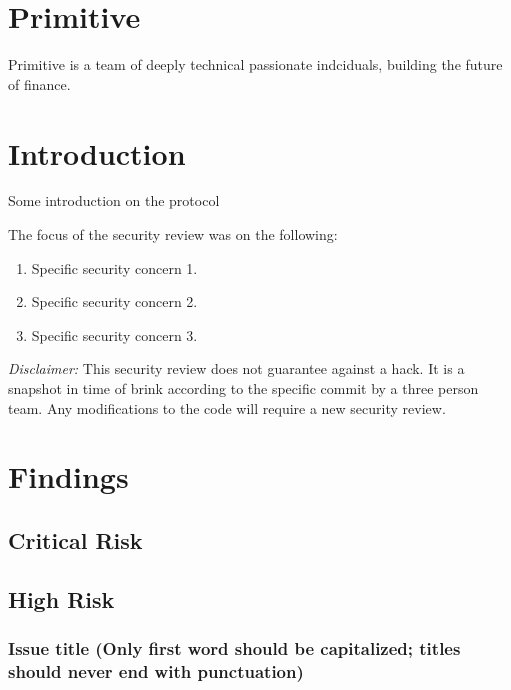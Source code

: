 \section{Primitive}\label{primitive}

Primitive is a team of deeply technical passionate indciduals, building
the future of finance.

\section{Introduction}\label{introduction}

Some introduction on the protocol

The focus of the security review was on the following:

\begin{enumerate}
\def\labelenumi{\arabic{enumi}.}
\tightlist
\item
  Specific security concern 1.
\item
  Specific security concern 2.
\item
  Specific security concern 3.
\end{enumerate}

\emph{Disclaimer:} This security review does not guarantee against a
hack. It is a snapshot in time of brink according to the specific commit
by a three person team. Any modifications to the code will require a new
security review.

\section{Findings}\label{findings}

\subsection{Critical Risk}\label{critical-risk}

\subsection{High Risk}\label{high-risk}

\subsubsection{Issue title (Only first word should be capitalized;
titles should never end with
punctuation)}\label{issue-title-only-first-word-should-be-capitalized-titles-should-never-end-with-punctuation}

